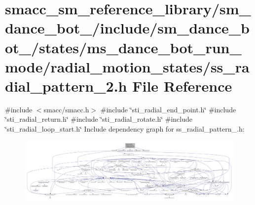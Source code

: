 \hypertarget{sm__dance__bot__2_2include_2sm__dance__bot__2_2states_2ms__dance__bot__run__mode_2radial__motion5ab70a5f73af4106fbf9fe71a55553b8}{}\section{smacc\+\_\+sm\+\_\+reference\+\_\+library/sm\+\_\+dance\+\_\+bot\+\_/include/sm\+\_\+dance\+\_\+bot\+\_/states/ms\+\_\+dance\+\_\+bot\+\_\+run\+\_\+mode/radial\+\_\+motion\+\_\+states/ss\+\_\+radial\+\_\+pattern\+\_\+2.h File Reference}
\label{sm__dance__bot__2_2include_2sm__dance__bot__2_2states_2ms__dance__bot__run__mode_2radial__motion5ab70a5f73af4106fbf9fe71a55553b8}
{\ttfamily \#include $<$smacc/smacc.\+h$>$}\newline
{\ttfamily \#include \char`\"{}sti\+\_\+radial\+\_\+end\+\_\+point.\+h\char`\"{}}\newline
{\ttfamily \#include \char`\"{}sti\+\_\+radial\+\_\+return.\+h\char`\"{}}\newline
{\ttfamily \#include \char`\"{}sti\+\_\+radial\+\_\+rotate.\+h\char`\"{}}\newline
{\ttfamily \#include \char`\"{}sti\+\_\+radial\+\_\+loop\+\_\+start.\+h\char`\"{}}\newline
Include dependency graph for ss\+\_\+radial\+\_\+pattern\+\_.\+h\+:
\nopagebreak
\begin{figure}[H]
\begin{center}
\leavevmode
\includegraphics[width=350pt]{sm__dance__bot__2_2include_2sm__dance__bot__2_2states_2ms__dance__bot__run__mode_2radial__motion3da1c755e1b55769598f8d5928de31f2}
\end{center}
\end{figure}
